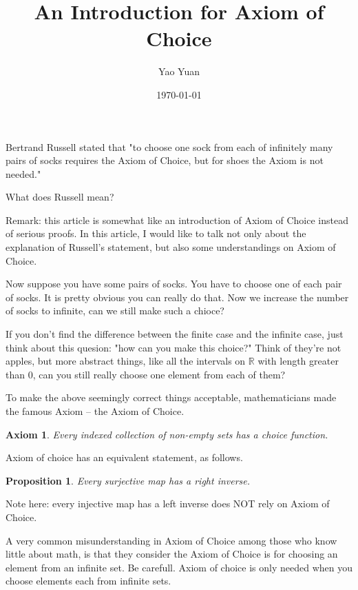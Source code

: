 \documentclass{article}
\title{An Introduction for Axiom of Choice}
\author{Yao Yuan}
\date{\today}
\newtheorem{axiom}[theorem]{Axiom}
\newtheorem{proposition}[theorem]{Proposition}
\newcommand\Real{\mathbb{R}}
\begin{document}
\maketitle

\begin{tcolorbox}
    Bertrand Russell stated that "to choose one sock from each of infinitely many pairs of socks requires the Axiom of Choice, but for shoes the Axiom is not needed." 
    
    What does Russell mean?
\end{tcolorbox}

Remark: this article is somewhat like an introduction of Axiom of Choice instead of serious proofs. In this article, I would like to talk not only about the explanation of Russell's statement, but also some understandings on Axiom of Choice.

Now suppose you have some pairs of socks. You have to choose one of each pair of socks. It is pretty obvious you can really do that. Now we increase the number of socks to infinite, can we still make such a chioce?

If you don't find the difference between the finite case and the infinite case, just think about this quesion: "how can you make this choice?" Think of they're not apples, but more abstract things, like all the intervals on $\Real$ with length greater than $0$, can you still really choose one element from each of them? 

To make the above seemingly correct things acceptable, mathematicians made the famous Axiom -- the Axiom of Choice. 

\begin{axiom}\label{axiom:AC}
    Every indexed collection of non-empty sets has a choice function.
\end{axiom}

Axiom of choice has an equivalent statement, as follows.

\begin{proposition}
    Every surjective map has a right inverse.
\end{proposition}

Note here: every injective map has a left inverse does NOT rely on Axiom of Choice.

A very common misunderstanding in Axiom of Choice among those who know little about math, is that they consider the Axiom of Choice is for choosing an element from an infinite set. Be carefull. Axiom of choice is only needed when you choose elements each from infinite sets.
\end{document}
